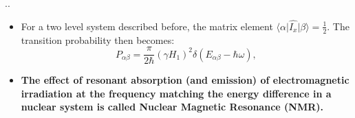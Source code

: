 \documentclass{beamer}
\begin{document}
\begin{frame}{\thesection.\thesubsection. \insertsubsection}
	\begin{itemize}[]
		\item 
		For a two level system described before, the matrix element $\langle \alpha \vert \hat{I_x} \vert \beta \rangle = \frac{1}{2}$. The transition probability then becomes:
		\begin{equation}
		P_{\alpha \beta} = \frac{\pi}{2\hbar} (\gamma H_1)^2 \delta(E_{\alpha \beta}-\hbar \omega),
		\end{equation}
		\item
		    \textbf{The effect of resonant absorption (and emission) of electromagnetic irradiation at the frequency matching the energy difference in a nuclear system is called Nuclear Magnetic Resonance (NMR).} 		    
		    
		    
	\end{itemize}

\end{frame}	
\begin{frame}

	

\end{frame}
\end{document}
